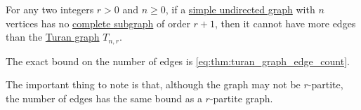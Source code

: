 \begin{theorem}\label{thm:turans_theorem}
  For any two integers \( r > 0 \) and \( n \geq 0 \), if a \hyperref[def:undirected_graph]{simple undirected graph} with \( n \) vertices has no \hyperref[def:complete_subgraph]{complete subgraph} of order \( r + 1 \), then it cannot have more edges than the \hyperref[def:turan_graph]{Turan graph} \( T_{n,r} \).
\end{theorem}
\begin{comments}
  \item The exact bound on the number of edges is \eqref{eq:thm:turan_graph_edge_count}.

  \item The important thing to note is that, although the graph may not be \( r \)-partite, the number of edges has the same bound as a \( r \)-partite graph.
\end{comments}
